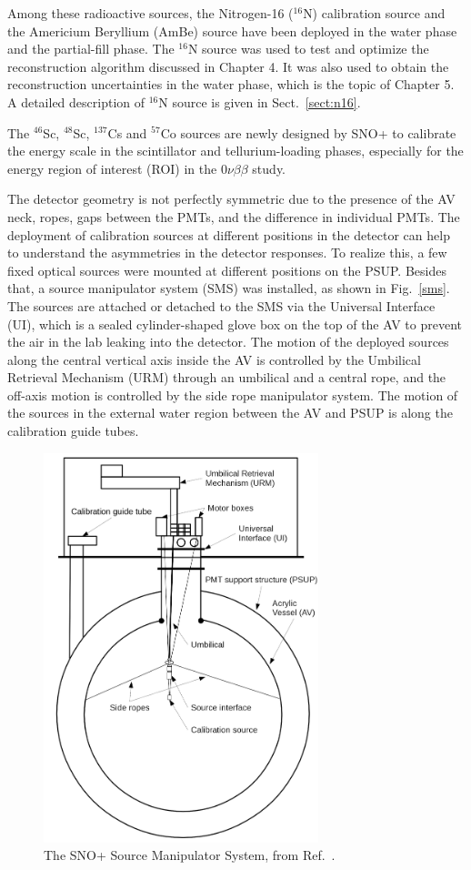 Among these radioactive sources, the Nitrogen-16 ($^{16}$N) calibration source and the Americium Beryllium (AmBe) source have been deployed in the water phase and the partial-fill phase. The $^{16}$N source was used to test and optimize the reconstruction algorithm discussed in Chapter 4. It was also used to obtain the reconstruction uncertainties in the water phase, which is the topic of Chapter 5. A detailed description of $^{16}$N source is given in Sect.~\ref{sect:n16}. 

The $^{46}$Sc, $^{48}$Sc, $^{137}$Cs and $^{57}$Co sources are newly designed by SNO+ to calibrate the energy scale in the scintillator and tellurium-loading phases, especially for the energy region of interest (ROI) in the $0\nu\beta\beta$ study\cite{snop_jinst}. 

The detector geometry is not perfectly symmetric due to the presence of the AV neck, ropes, gaps between the PMTs, and the difference in individual PMTs\cite{snop_jinst}. The deployment of calibration sources at different positions in the detector can help to understand the asymmetries in the detector responses. To realize this, a few fixed optical sources were mounted at different positions on the PSUP. Besides that, a source manipulator system (SMS) was installed, as shown in Fig.~\ref{sms}. The sources are attached or detached to the SMS via the Universal Interface (UI), which is a sealed cylinder-shaped glove box on the top of the AV to prevent the air in the lab leaking into the detector. The motion of the deployed sources along the central vertical axis inside the AV is controlled by the Umbilical Retrieval Mechanism (URM) through an umbilical and a central rope, and the off-axis motion is controlled by the side rope manipulator system. The motion of the sources in the external water region between the AV and PSUP is along the calibration guide tubes\cite{snop_jinst}.

\begin{figure}[!htb]
	\centering
	\includegraphics[width=8cm]{SMS.png}
	\caption[The SNO+ Source Manipulator System.]{The SNO+ Source Manipulator System, from Ref.~\cite{snop_jinst}.}
	\label{fig: sms}
\end{figure}

